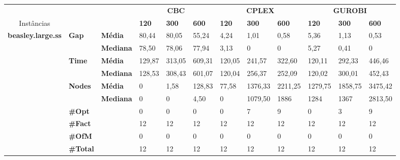 \documentclass[]{article}
\begin{document}
	
	\begin{table}[]
		\begin{adjustbox}{angle=90}
			\begin{tabular}{cll|lll|lll|lll}
				& & & \multicolumn{3}{c}{\textbf{CBC}} & \multicolumn{3}{c}{\textbf{CPLEX}} & \multicolumn{3}{c}{\textbf{GUROBI}} 	\\Instâncias & & & \textbf{120} & \textbf{300} & \textbf{600} & \textbf{120} & \textbf{300} & \textbf{600} & \textbf{120} & \textbf{300} & \textbf{600} \\
				\hline
				\multirow{7}{*}{\textbf{beasley.large.ss}} & \multirow{2}{*}{\textbf{Gap}} & \textbf{Média} & 80,44 & 80,05 & 55,24 & 4,24 & 1,01 & 0,58 & 5,36 & 1,13 & 0,53 \\
				& & \textbf{Mediana} & 78,50 & 78,06 & 77,94 & 3,13 & 0 & 0 & 5,27 & 0,41 & 0 \\
				\cline{2-12}
				& \multirow{2}{*}{\textbf{Time}} & \textbf{Média} & 129,87 & 313,05 & 609,31 & 120,05 & 241,57 & 322,60 & 120,11 & 292,33 & 446,46 \\
				& & \textbf{Mediana} & 128,53 & 308,43 & 601,07 & 120,04 & 256,37 & 252,09 & 120,02 & 300,01 & 452,43 \\
				\cline{2-12}
				& \multirow{2}{*}{\textbf{Nodes}} & \textbf{Média} & 0 & 1,58 & 128,83 & 77,58 & 1376,33 & 2211,25 & 1279,75 & 1858,75 & 3475,42 \\
				& & \textbf{Mediana} & 0 & 0 & 4,50 & 0 & 1079,50 & 1886 & 1284 & 1367 & 2813,50 \\
				\cline{2-12}
				& \textbf{\#Opt} & & 0 & 0 & 0 & 0 & 7 & 9 & 0 & 3 & 9 \\
				& \textbf{\#Fact} & & 12 & 12 & 12 & 12 & 12 & 12 & 12 & 12 & 12 \\
				& \textbf{\#OfM} & & 0 & 0 & 0 & 0 & 0 & 0 & 0 & 0 & 0 \\
				& \textbf{\#Total} & & 12 & 12 & 12 & 12 & 12 & 12 & 12 & 12 & 12 \\
			\end{tabular}
		\end{adjustbox}
	\end{table}
	
\end{document}
